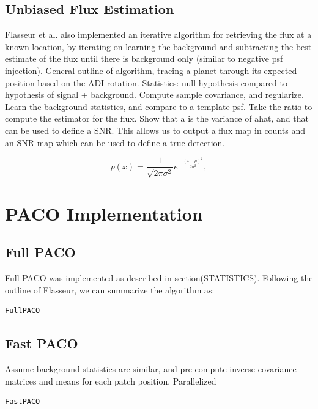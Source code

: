\documentclass[twocolumn,fleqn]{aastex62}
\begin{document}
\subsection{Unbiased Flux Estimation}
Flasseur et al. also implemented an iterative algorithm for retrieving the flux at a known location, by iterating on learning the background and subtracting the best estimate of the flux until there is background only (similar to negative psf injection).
General outline of algorithm, tracing a planet through its expected position based on the ADI rotation.
Statistics: null hypothesis compared to hypothesis of signal + background.
Compute sample covariance, and regularize.
Learn the background statistics, and compare to a template psf.
Take the ratio to compute the estimator for the flux.
Show that a is the variance of ahat, and that can be used to define a SNR.
This allows us to output a flux map in counts and an SNR map which can be used to define a true detection.

\begin{equation}
p(x) = \frac{1}{\sqrt{ 2 \pi \sigma^2 }} e^{ - \frac{ (x - \mu)^2 } {2 \sigma^2} },
\end{equation}

\section{PACO Implementation}
\subsection{Full PACO}
Full PACO was implemented as described in section(STATISTICS). Following the outline of Flasseur, we can summarize the algorithm as:
\begin{lstlisting}
FullPACO
\end{lstlisting}
\subsection{Fast PACO}
Assume background statistics are similar, and pre-compute inverse covariance matrices and means for each patch position. 
Parallelized
\begin{lstlisting}
FastPACO
\end{lstlisting}
\end{document}
